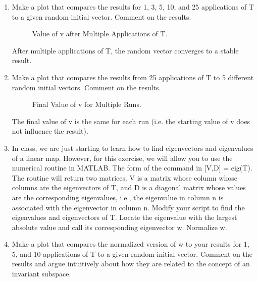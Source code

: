 \documentclass[fleqn]{article}
\begin{document}
\begin{enumerate}[nolistsep]
\begin{enumerate}
				\item Make a plot that compares the results for 1, 3, 5, 10, and 25 applications of T to a given random initial vector. Comment on the results.
				
					\begin{figure}[H]				
							\centerline{}
							\caption{Value of v after Multiple Applications of T.}
							\label{multiple_apps_of_T}
					\end{figure}
				
					After multiple applications of T, the random vector converges to a stable result.
					
					
				\item Make a plot that compares the results from 25 applications of T to 5 different random initial vectors. Comment on the results.
				
					\begin{figure}[H]				
							\centerline{}
							\caption{Final Value of v for Multiple Runs.}
							\label{final_value_multiple_runs}
					\end{figure}
					
					The final value of v is the same for each run (i.e. the starting value of v does not influence the result).
					
				\item In class, we are just starting to learn how to find eigenvectors and eigenvalues of a linear map. However, for this exercise, we will allow you to use the numerical routine in MATLAB. The form of the command in [V,D] = eig(T). The routine will return two matrices. V is a matrix whose column whose columns are the eigenvectors of T, and D is a diagonal matrix whose values are the corresponding eigenvalues, i.e., the eigenvalue in column n is associated with the eigenvector in column n. Modify your script to find the eigenvalues and eigenvectors of T. Locate the eigenvalue with the largest absolute value and call its corresponding eigenvector w. Normalize w.
				
				\item Make a plot that compares the normalized version of w to your results for 1, 5, and 10 applications of T to a given random initial vector. Comment on the results and argue intuitively about how they are related to the concept of an invariant subspace.
				

\end{enumerate}
\end{enumerate}
\end{document}
